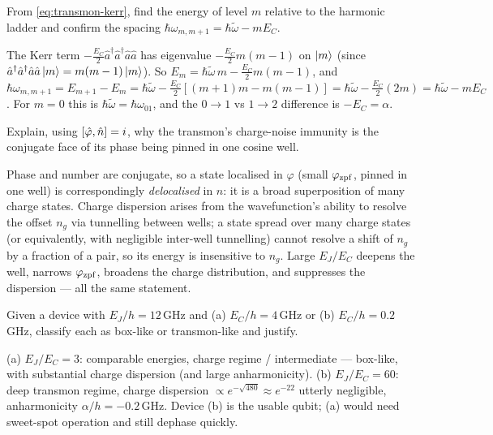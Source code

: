 \begin{exercise}
From \cref{eq:transmon-kerr}, find the energy of level $m$ relative to
the harmonic ladder and confirm the spacing
$\hbar\omega_{m,m+1}=\hbar\tilde\omega-mE_C$.
\begin{solution}
The Kerr term $-\tfrac{E_C}{2}\hat a^\dagger\hat a^\dagger\hat a\hat a$
has eigenvalue $-\tfrac{E_C}{2}m(m-1)$ on $\ket m$ (since
$\hat a^\dagger\hat a^\dagger\hat a\hat a\ket m=m(m-1)\ket m$). So
$E_m=\hbar\tilde\omega\,m-\tfrac{E_C}{2}m(m-1)$, and
$\hbar\omega_{m,m+1}=E_{m+1}-E_m
=\hbar\tilde\omega-\tfrac{E_C}{2}[(m+1)m-m(m-1)]
=\hbar\tilde\omega-\tfrac{E_C}{2}(2m)=\hbar\tilde\omega-mE_C$. For $m=0$
this is $\hbar\tilde\omega=\hbar\omega_{01}$, and the $0\to1$ vs $1\to2$
difference is $-E_C=\alpha$.
\end{solution}
\end{exercise}

\begin{exercise}
Explain, using $\comm{\op\varphi}{\op n}=i$, why the transmon's
charge-noise immunity is the conjugate face of its phase being pinned
in one cosine well.
\begin{solution}
Phase and number are conjugate, so a state localised in $\varphi$
(small $\varphi_{\rm zpf}$, pinned in one well) is correspondingly
\emph{delocalised} in $n$: it is a broad superposition of many charge
states. Charge dispersion arises from the wavefunction's ability to
resolve the offset $n_g$ via tunnelling between wells; a state spread
over many charge states (or equivalently, with negligible inter-well
tunnelling) cannot resolve a shift of $n_g$ by a fraction of a pair, so
its energy is insensitive to $n_g$. Large $E_J/E_C$ deepens the well,
narrows $\varphi_{\rm zpf}$, broadens the charge distribution, and
suppresses the dispersion --- all the same statement.
\end{solution}
\end{exercise}

\begin{exercise}
Given a device with $E_J/h=12\,$GHz and (a) $E_C/h=4\,$GHz or
(b) $E_C/h=0.2\,$GHz, classify each as box-like or transmon-like and
justify.
\begin{solution}
(a) $E_J/E_C=3$: comparable energies, charge regime / intermediate ---
box-like, with substantial charge dispersion (and large
anharmonicity). (b) $E_J/E_C=60$: deep transmon regime, charge
dispersion $\propto e^{-\sqrt{480}}\approx e^{-22}$ utterly negligible,
anharmonicity $\alpha/h=-0.2\,$GHz. Device (b) is the usable qubit;
(a) would need sweet-spot operation and still dephase quickly.
\end{solution}
\end{exercise}

